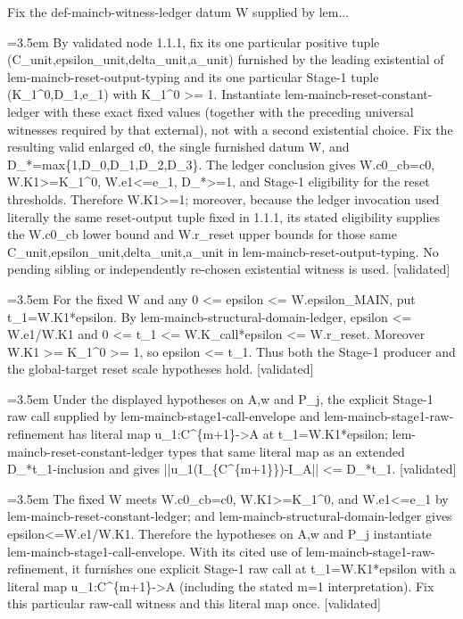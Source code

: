 \documentclass{article}
\newcommand{\step}[1]{\par\noindent\hangindent=3.5em\hangafter=1%
  \makebox[3.5em][l]{\textbf{#1.}}}
\newcommand{\steptag}[1]{\hfill{\small\textsf{[#1]}}}
\begin{document}
\begin{proofbox}{Fix the def-maincb-witness-ledger datum W supplied by lem...}
\step{1.1.2.1} By validated node 1.1.1, fix its one particular positive tuple (C\_unit,epsilon\_unit,delta\_unit,a\_unit) furnished by the leading existential of lem-maincb-reset-output-typing and its one particular Stage-1 tuple (K\_1\textasciicircum{}0,D\_1,e\_1) with K\_1\textasciicircum{}0 >= 1. Instantiate lem-maincb-reset-constant-ledger with these exact fixed values (together with the preceding universal witnesses required by that external), not with a second existential choice. Fix the resulting valid enlarged c0, the single furnished datum W, and D\_*=max\{1,D\_0,D\_1,D\_2,D\_3\}. The ledger conclusion gives W.c0\_cb=c0, W.K1>=K\_1\textasciicircum{}0, W.e1<=e\_1, D\_*>=1, and Stage-1 eligibility for the reset thresholds. Therefore W.K1>=1; moreover, because the ledger invocation used literally the same reset-output tuple fixed in 1.1.1, its stated eligibility supplies the W.c0\_cb lower bound and W.r\_reset upper bounds for those same C\_unit,epsilon\_unit,delta\_unit,a\_unit in lem-maincb-reset-output-typing. No pending sibling or independently re-chosen existential witness is used. \steptag{validated} \\[4pt]
\step{1.2} For the fixed W and any 0 <= epsilon <= W.epsilon\_MAIN, put t\_1=W.K1*epsilon. By lem-maincb-structural-domain-ledger, epsilon <= W.e1/W.K1 and 0 <= t\_1 <= W.K\_call*epsilon <= W.r\_reset. Moreover W.K1 >= K\_1\textasciicircum{}0 >= 1, so epsilon <= t\_1. Thus both the Stage-1 producer and the global-target reset scale hypotheses hold. \steptag{validated} \\[4pt]
\step{1.3} Under the displayed hypotheses on A,w and P\_j, the explicit Stage-1 raw call supplied by lem-maincb-stage1-call-envelope and lem-maincb-stage1-raw-refinement has literal map u\_1:C\textasciicircum{}\{m+1\}->A at t\_1=W.K1*epsilon; lem-maincb-reset-constant-ledger types that same literal map as an extended D\_*t\_1-inclusion and gives ||u\_1(I\_\{C\textasciicircum{}\{m+1\}\})-I\_A|| <= D\_*t\_1. \steptag{validated} \\[6pt]
\step{1.3.1} The fixed W meets W.c0\_cb=c0, W.K1>=K\_1\textasciicircum{}0, and W.e1<=e\_1 by lem-maincb-reset-constant-ledger; and lem-maincb-structural-domain-ledger gives epsilon<=W.e1/W.K1. Therefore the hypotheses on A,w and P\_j instantiate lem-maincb-stage1-call-envelope. With its cited use of lem-maincb-stage1-raw-refinement, it furnishes one explicit Stage-1 raw call at t\_1=W.K1*epsilon with a literal map u\_1:C\textasciicircum{}\{m+1\}->A (including the stated m=1 interpretation). Fix this particular raw-call witness and this literal map once. \steptag{validated} \\[4pt]

\end{proofbox}
\end{document}

